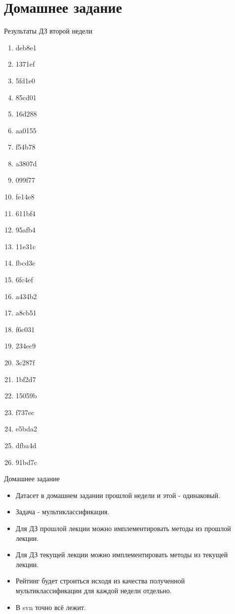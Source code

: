 \documentclass[14pt, fleqn, xcolor={dvipsnames, table}]{beamer}
\begin{document}
\section{Домашнее задание}
\begin{frame}{Результаты ДЗ второй недели}
\tiny
\begin{center}
\begin{enumerate}
\item deb8e1
\item 1371ef
\item 5fd1e0
\item 85cd01
\item 16d288
\item aa0155
\item f54b78
\item a3807d
\item 099f77
\item fe14e8
\item 611bf4
\item 95afb4
\item 11e31c
\item fbcd3c
\item 6fc4ef
\item a434b2
\item a8cb51
\item f6c031
\item 234ec9
\item 3c287f
\item 1bf2d7
\item 15059b
\item f737ec
\item e5bda2
\item dfba4d
\item 91bd7c
\end{enumerate}
\end{center}
\end{frame}
\begin{frame}{Домашнее задание}
\begin{itemize}
\item Датасет в домашнем задании прошлой недели и этой - одинаковый.
\item Задача - мультиклассификация.
\item Для ДЗ прошлой лекции можно имплементировать методы из прошлой лекции.
\item Для ДЗ текущей лекции можно имплементировать методы из текущей лекции.
\item Рейтинг будет строиться исходя из качества полученной мультиклассификации для каждой недели отдельно.
\item В svn точно всё лежит.
\end{itemize}
\end{frame}
\end{document}
